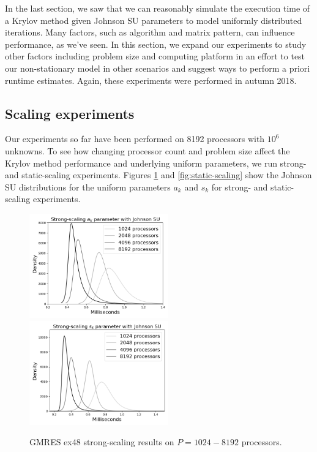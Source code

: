 \documentclass[sigconf]{acmart}
\begin{document}
In the last section, we saw that we can reasonably simulate the execution time of a Krylov method given Johnson SU parameters to model uniformly distributed iterations. 
Many factors, such as algorithm and matrix pattern, can influence performance, as we've seen. 
In this section, we expand our experiments to study other factors including problem size and computing platform in an effort to test our non-stationary model in other scenarios and suggest ways to perform a priori runtime estimates.
Again, these experiments were performed in autumn 2018. 

\subsection{Scaling experiments}\label{sec:scaling}


Our experiments so far have been performed on 8192 processors with $10^6$ unknowns.
To see how changing processor count and problem size affect the Krylov method performance and underlying uniform parameters, we run strong- and static-scaling experiments.
Figures \ref{fig:strong-scaling} and \ref{fig:static-scaling} show the Johnson SU distributions for the uniform parameters $a_k$ and $s_k$ for strong- and static-scaling experiments. 


\begin{figure}[t]
\centering
\includegraphics[width=6cm]{../plots/GMRES_ex48_1000000_a_k_strong_scaling_johnsonsu.png}
\includegraphics[width=6cm]{../plots/PGMRES_ex48_1000000_s_k_strong_scaling_johnsonsu.png} 
\caption{GMRES ex48 strong-scaling results on $P = 1024 - 8192$ processors.} \label{fig:strong-scaling}
\end{figure}
 
\end{document}
